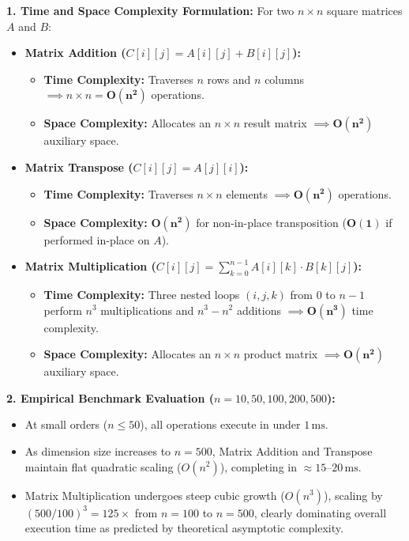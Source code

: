 \documentclass[12pt]{article}
\begin{document}
\textbf{1. Time and Space Complexity Formulation:}
For two $n \times n$ square matrices $A$ and $B$:
\begin{itemize}
    \item \textbf{Matrix Addition ($C[i][j] = A[i][j] + B[i][j]$):}
    \begin{itemize}
        \item \textbf{Time Complexity:} Traverses $n$ rows and $n$ columns $\implies n \times n = \mathbf{O(n^2)}$ operations.
        \item \textbf{Space Complexity:} Allocates an $n \times n$ result matrix $\implies \mathbf{O(n^2)}$ auxiliary space.
    \end{itemize}
    \item \textbf{Matrix Transpose ($C[i][j] = A[j][i]$):}
    \begin{itemize}
        \item \textbf{Time Complexity:} Traverses $n \times n$ elements $\implies \mathbf{O(n^2)}$ operations.
        \item \textbf{Space Complexity:} $\mathbf{O(n^2)}$ for non-in-place transposition ($\mathbf{O(1)}$ if performed in-place on $A$).
    \end{itemize}
    \item \textbf{Matrix Multiplication ($C[i][j] = \sum_{k=0}^{n-1} A[i][k] \cdot B[k][j]$):}
    \begin{itemize}
        \item \textbf{Time Complexity:} Three nested loops $(i, j, k)$ from $0$ to $n-1$ perform $n^3$ multiplications and $n^3 - n^2$ additions $\implies \mathbf{O(n^3)}$ time complexity.
        \item \textbf{Space Complexity:} Allocates an $n \times n$ product matrix $\implies \mathbf{O(n^2)}$ auxiliary space.
    \end{itemize}
\end{itemize}

\textbf{2. Empirical Benchmark Evaluation ($n = 10, 50, 100, 200, 500$):}
\begin{itemize}
    \item At small orders ($n \le 50$), all operations execute in under $1\,\text{ms}$.
    \item As dimension size increases to $n = 500$, Matrix Addition and Transpose maintain flat quadratic scaling ($O(n^2)$), completing in $\approx 15\text{--}20\,\text{ms}$.
    \item Matrix Multiplication undergoes steep cubic growth ($O(n^3)$), scaling by $(500/100)^3 = 125\times$ from $n=100$ to $n=500$, clearly dominating overall execution time as predicted by theoretical asymptotic complexity.
\end{itemize}
\end{document}
